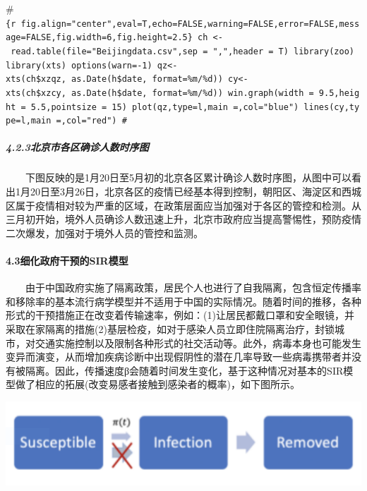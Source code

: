 \documentclass[12pt,a5paper,]{article}
\let\oldparagraph\paragraph
\renewcommand{\paragraph}[1]{\oldparagraph{#1}\mbox{}}
\let\oldsubparagraph\subparagraph
\renewcommand{\subparagraph}[1]{\oldsubparagraph{#1}\mbox{}}
\begin{document}
\#\texttt{\{r\ fig.align="center",eval=T,echo=FALSE,warning=FALSE,error=FALSE,message=FALSE,fig.width=6,fig.height=2.5\}\ ch\ \textless{}-\ read.table(file="Beijingdata.csv",sep\ =\ ",",header\ =\ T)\ library(zoo)\ library(xts)\ options(warn=-1)\ qz\textless{}-xts(ch\$xzqz,\ as.Date(h\$date,\ format=\textquotesingle{}\%m/\%d\textquotesingle{}))\ cy\textless{}-xts(ch\$xzcy,\ as.Date(h\$date,\ format=\textquotesingle{}\%m/\%d\textquotesingle{}))\ win.graph(width\ =\ 9.5,height\ =\ 5.5,pointsize\ =\ 15)\ plot(qz,type=\textquotesingle{}l\textquotesingle{},main\ =\textquotesingle{}\textquotesingle{},col="blue")\ lines(cy,type=\textquotesingle{}l\textquotesingle{},main\ =\textquotesingle{}\textquotesingle{},col="red")\ \#}

\hypertarget{ux5317ux4eacux5e02ux5404ux533aux786eux8bcaux4ebaux6570ux65f6ux5e8fux56fe}{%
\subparagraph{4.2.3北京市各区确诊人数时序图}\label{ux5317ux4eacux5e02ux5404ux533aux786eux8bcaux4ebaux6570ux65f6ux5e8fux56fe}}

  下图反映的是1月20日至5月初的北京各区累计确诊人数时序图，从图中可以看出1月20日至3月26日，北京各区的疫情已经基本得到控制，朝阳区、海淀区和西城区属于疫情相对较为严重的区域，在政策层面应当加强对于各区的管控和检测。从三月初开始，境外人员确诊人数迅速上升，北京市政府应当提高警惕性，预防疫情二次爆发，加强对于境外人员的管控和监测。

\hypertarget{ux7ec6ux5316ux653fux5e9cux5e72ux9884ux7684sirux6a21ux578b}{%
\paragraph{4.3细化政府干预的SIR模型}\label{ux7ec6ux5316ux653fux5e9cux5e72ux9884ux7684sirux6a21ux578b}}

  由于中国政府实施了隔离政策，居民个人也进行了自我隔离，包含恒定传播率和移除率的基本流行病学模型并不适用于中国的实际情况。随着时间的推移，各种形式的干预措施正在改变着传输速率，例如：(1)让居民都戴口罩和安全眼镜，并采取在家隔离的措施(2)基层检疫，如对于感染人员立即住院隔离治疗，封锁城市，对交通实施控制以及限制各种形式的社交活动等。此外，病毒本身也可能发生变异而演变，从而增加疾病诊断中出现假阴性的潜在几率导致一些病毒携带者并没有被隔离。因此，传播速度β会随着时间发生变化，基于这种情况对基本的SIR模型做了相应的拓展(改变易感者接触到感染者的概率)，如下图所示。

\includegraphics[width=6.38in]{figures/1}
\end{document}
